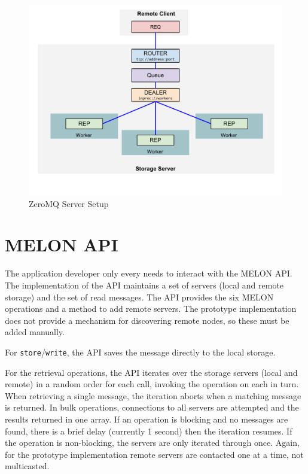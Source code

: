 \begin{figure}
\centering
\includegraphics[scale = .60, clip, trim = 0px 0px 0px 0px]{figures/zeromq-server.pdf}
\caption{ZeroMQ Server Setup}
\label{fig:zeromqserver}
\end{figure}

\section{MELON API}

The application developer only every needs to interact with the MELON API. The implementation of the API maintains a set of servers (local and remote storage) and the set of read messages. The API provides the six MELON operations and a method to add remote servers. The prototype implementation does not provide a mechanism for discovering remote nodes, so these must be added manually.

For \texttt{store}/\texttt{write}, the API saves the message directly to the local storage.

For the retrieval operations, the API iterates over the storage servers (local and remote) in a random order for each call, invoking the operation on each in turn. When retrieving a single message, the iteration aborts when a matching message is returned. In bulk operations, connections to all servers are attempted and the results returned in one array. If an operation is blocking and no messages are found, there is a brief delay (currently 1 second) then the iteration resumes. If the operation is non-blocking, the servers are only iterated through once. Again, for the prototype implementation remote servers are contacted one at a time, not multicasted.